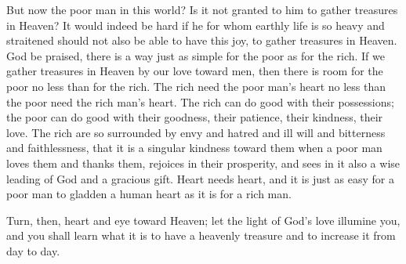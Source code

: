 But now the poor man in this world? Is it not granted to him to gather treasures in Heaven? It would indeed be hard if he for whom earthly life is so heavy and straitened should not also be able to have this joy, to gather treasures in Heaven. God be praised, there is a way just as simple for the poor as for the rich. If we gather treasures in Heaven by our love toward men, then there is room for the poor no less than for the rich. The rich need the poor man’s heart no less than the poor need the rich man’s heart. The rich can do good with their possessions; the poor can do good with their goodness, their patience, their kindness, their love. The rich are so surrounded by envy and hatred and ill will and bitterness and faithlessness, that it is a singular kindness toward them when a poor man loves them and thanks them, rejoices in their prosperity, and sees in it also a wise leading of God and a gracious gift. Heart needs heart, and it is just as easy for a poor man to gladden a human heart as it is for a rich man.

Turn, then, heart and eye toward Heaven; let the light of God’s love illumine you, and you shall learn what it is to have a heavenly treasure and to increase it from day to day.

